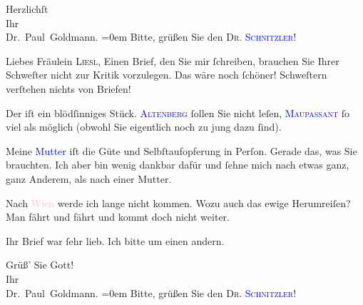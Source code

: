\pstart
           Herzlichſt {\\[\baselineskip]}Ihr {\\[\baselineskip]}\spacefill\mbox{Dr. Paul Goldmann.}\pend
           \leftskip=0em{}
\pstart
           \noindent{}Bitte, grüßen Sie den \textsc{Dr. \textcolor{blue}{Schnitzler}{}\ledrightnote{}}!\pend
           
\pstart{}{\pb}Liebes Fräulein \textsc{Liesl},\pend
\pstart
           Einen Brief, den Sie mir ſchreiben, brauchen Sie Ihrer Schweſter nicht zur Kritik
               vorzulegen. Das wäre noch ſchöner! Schweſtern verſtehen nichts von Briefen!\pend
           
\pstart
           Der \label{K_L03538-2v}\label{K_L03538-2h} iſt ein
               blödſinniges Stück. \textsc{\textcolor{blue}{Altenberg}{}\ledrightnote{\textcolor{blue}{Peter Altenberg}}} ſollen Sie nicht leſen, \textsc{\textcolor{blue}{Maupassant}{}\ledrightnote{\textcolor{blue}{Guy de Maupassant}}} ſo viel als möglich (obwohl Sie eigentlich noch zu jung dazu ſind).\pend
           
\pstart
           Meine \textcolor{blue}{Mutter}{}\ledrightnote{{$\rightarrow$}\textcolor{blue}{Clementine Goldmann}} iſt die Güte
               und Selbſtaufopferung in Perſon. Gerade das, was Sie brauchten. Ich aber bin wenig
               dankbar dafür und ſehne mich nach etwas ganz, ganz Anderem, als nach einer
               Mutter.\pend
           
\pstart
           Nach \textcolor{pink}{Wien}{}\ledrightnote{\textcolor{pink}{Wien}} werde ich lange nicht kommen. Wozu auch
               das ewige Herumreiſen? {\pb}Man fährt und fährt und
               kommt doch nicht weiter.\pend
           
\pstart
           Ihr Brief war ſehr lieb. Ich bitte um einen andern.\pend
           
\pstart
           Grüß’ Sie Gott! {\\[\baselineskip]}Ihr {\\[\baselineskip]}\spacefill\mbox{Dr. Paul Goldmann.}\pend
           \leftskip=0em{}
\pstart
           \noindent{}Bitte, grüßen Sie den \textsc{Dr. \textcolor{blue}{Schnitzler}{}\ledrightnote{}}!\pend
           \endnumbering{}  
      